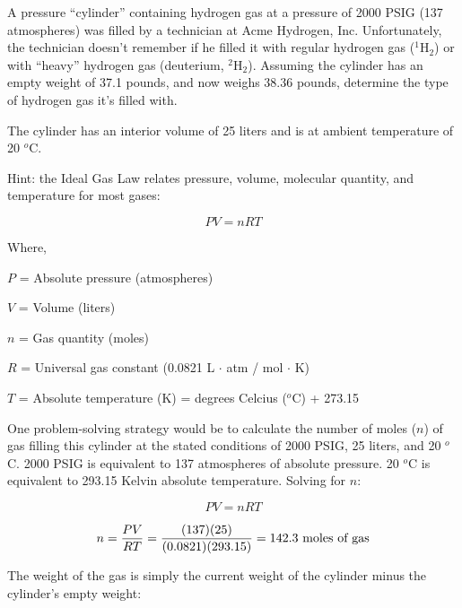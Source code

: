 

A pressure ``cylinder'' containing hydrogen gas at a pressure of 2000 PSIG (137 atmospheres) was filled by a technician at Acme Hydrogen, Inc.  Unfortunately, the technician doesn't remember if he filled it with regular hydrogen gas ($^{1}$H$_{2}$) or with ``heavy'' hydrogen gas (deuterium, $^{2}$H$_{2}$).  Assuming the cylinder has an empty weight of 37.1 pounds, and now weighs 38.36 pounds, determine the type of hydrogen gas it's filled with. 

\vskip 10pt

The cylinder has an interior volume of 25 liters and is at ambient temperature of 20 $^{o}$C.

\vskip 10pt

Hint: the Ideal Gas Law relates pressure, volume, molecular quantity, and temperature for most gases:

$$PV = nRT$$

\noindent
Where,

$P$ = Absolute pressure (atmospheres)

$V$ = Volume (liters)

$n$ = Gas quantity (moles)

$R$ = Universal gas constant (0.0821 L $\cdot$ atm / mol $\cdot$ K)

$T$ = Absolute temperature (K) = degrees Celcius ($^{o}$C) + 273.15

\vskip 10pt








One problem-solving strategy would be to calculate the number of moles ($n$) of gas filling this cylinder at the stated conditions of 2000 PSIG, 25 liters, and 20 $^{o}$C.  2000 PSIG is equivalent to 137 atmospheres of absolute pressure.  20 $^{o}$C is equivalent to 293.15 Kelvin absolute temperature.  Solving for $n$:

$$PV = nRT$$

$$n = {PV \over RT} = {(137)(25) \over (0.0821)(293.15)} = 142.3 \hbox{ moles of gas}$$

The weight of the gas is simply the current weight of the cylinder minus the cylinder's empty weight:

